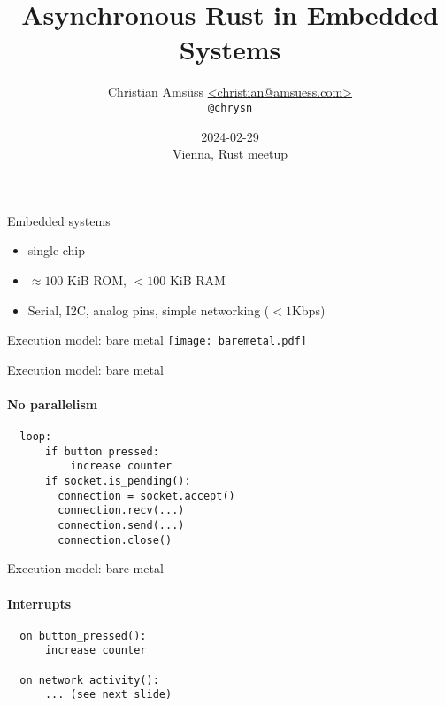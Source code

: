 \documentclass[aspectratio=169]{beamer}
\title{Asynchronous Rust in Embedded Systems}
\author{Christian Amsüss \url{<christian@amsuess.com>}\\\texttt{@chrysn}}
\date{2024-02-29\\Vienna, Rust meetup}
\begin{document}
\frame{\titlepage}

\begin{frame}{Embedded systems}\Large
  \begin{itemize}
    \item single chip
    \item $\approx 100$ KiB ROM, $< 100$ KiB RAM
    \item Serial, I2C, analog pins, simple networking ($< 1$Kbps)
  \end{itemize}
\end{frame}

\begin{frame}{Execution model: bare metal}\Large
  \center
  \vspace{-1em}
  \texttt{[image: baremetal.pdf]}


\end{frame}

\begin{frame}[fragile]{Execution model: bare metal}\Large
\framesubtitle{No parallelism}
  \begin{verbatim}
  loop:
      if button pressed:
          increase counter
      if socket.is_pending():
        connection = socket.accept()
        connection.recv(...)
        connection.send(...)
        connection.close()
  \end{verbatim}
\end{frame}

\begin{frame}[fragile]{Execution model: bare metal}\Large
\framesubtitle{Interrupts}
  \begin{verbatim}
  on button_pressed():
      increase counter

  on network activity():
      ... (see next slide)
  \end{verbatim}
\end{frame}
\end{document}
